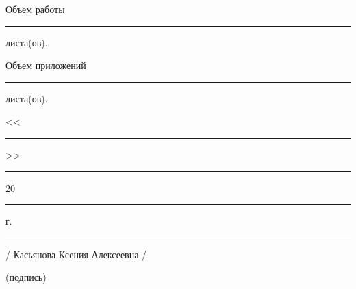 \documentclass[12pt,a4paper, oneside]{extreport}
\begin{document}
\vspace{2ex}

 Объем работы  \rule{2em}{0.5pt} листа(ов).

\vspace{2ex}

 Объем приложений \rule{2em}{0.5pt} листа(ов).

\vspace{4ex}

\noindent << \rule{1em}{0.5pt} >> \rule{5em}{0.5pt} 20 \rule{1.4em}{0.5pt} г. 

\vspace{4ex}



\noindent \rule{11em}{0.5pt} 
\hspace{8em} / Касьянова Ксения Алексеевна /

\hspace{0.5cm} \footnotesize (подпись)


\end{document}
